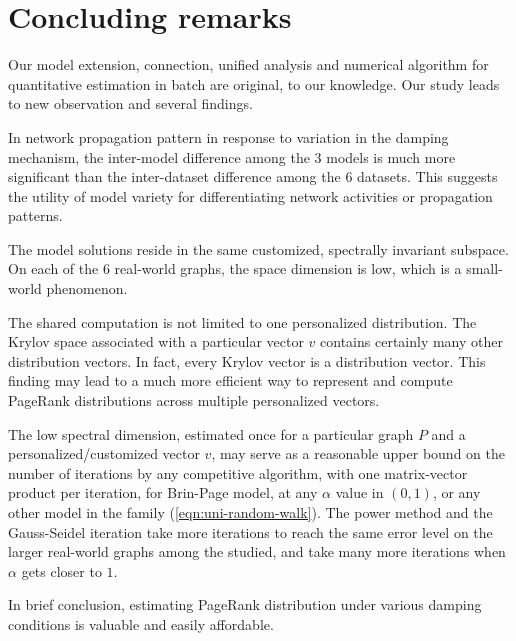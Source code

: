 \documentclass[conference]{IEEEtran}
\begin{document}
%


\section{Concluding remarks} 
%

Our model extension, connection, unified analysis and numerical
algorithm for quantitative estimation in batch are original, to our
knowledge. Our study leads to new observation and several findings.
%
\begin{inparaenum}[(a)]
\item In network propagation pattern in response to variation in the 
  damping mechanism, the inter-model difference among the 3 models
  is much more significant than the inter-dataset difference among
  the 6 datasets. This suggests the utility of
  model variety for differentiating network activities or propagation
  patterns.
% 
\item The model solutions reside in the same customized, spectrally
  invariant subspace. On each of the $6$ real-world graphs, the space
  dimension is low, which is a small-world phenomenon.
% 
\item The shared computation is not limited to one personalized
  distribution. The Krylov space associated with a particular vector $v$
  contains certainly many other distribution vectors. In fact, every
  Krylov vector is a distribution vector. This finding may lead to a much 
  more efficient way to represent and compute PageRank distributions 
  across multiple personalized vectors.
% 
\item The low spectral dimension, estimated once for a particular graph
  $P$ and a personalized/customized vector $v$, may serve as a
  reasonable upper bound on the number of iterations by any competitive
  algorithm, with one matrix-vector product per iteration, for Brin-Page
  model, at any $\alpha$ value in $(0, 1)$, or any
  other model in the family (\ref{eqn:uni-random-walk}). The power method and the
  Gauss-Seidel iteration take more iterations to reach the same error
  level on the larger real-world graphs among the studied, and take many
  more iterations when $\alpha$ gets closer to $1$.
%
\end{inparaenum} 
%
In brief conclusion, estimating PageRank distribution under various
damping conditions is valuable and easily affordable.

\end{document}
